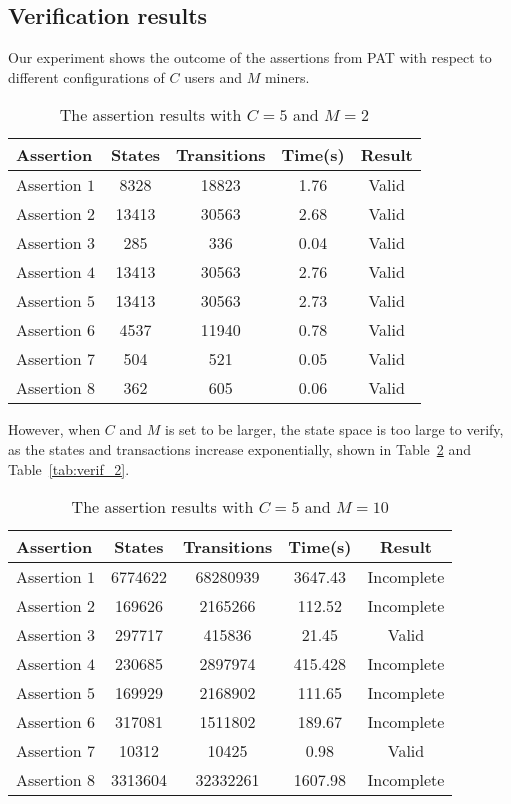 \documentclass{KERauth}
\begin{document}
\subsection{Verification results}
Our experiment shows the outcome of the assertions from PAT with respect to different configurations of $C$ users and $M$ miners.

\begin{table}[h]
    \centering
    \begin{tabular}{l|c|c|c|c}
    \hline
    {\bf Assertion} &{\bf States}& {\bf Transitions} &{\bf Time}(s)& {\bf Result}\\
    \hline
Assertion $1$ &8328 &18823 &1.76 &Valid\\
Assertion $2$ & 13413 &30563& 2.68 &Valid\\
Assertion $3$ &285 &336& 0.04& Valid\\
Assertion $4$ &13413 &30563& 2.76 &Valid\\
Assertion $5$ &13413 &30563 &2.73& Valid\\
Assertion $6$ &4537 &11940 &0.78 &Valid\\
Assertion $7$ &504& 521 &0.05 &Valid\\
Assertion $8$& 362 &605& 0.06 &Valid\\
\hline
    \end{tabular}
    \caption{The assertion results with $C = 5$ and $M = 2$}
    \label{tab:verification}
\end{table}

However, when $C$ and $M$ is set to be larger, the state space is too large to verify, as the states and transactions increase exponentially, shown in Table~\ref{tab:verif_1} and Table~\ref{tab:verif_2}.

\begin{table}[h]
    \centering
    \begin{tabular}{l|c|c|c|c}
    \hline
      Assertion &States &Transitions& Time(s) &Result\\
      \hline
Assertion $1$ & 6774622& 68280939 &3647.43 &Incomplete\\
Assertion $2$ & 169626 & 2165266 & 112.52 & Incomplete\\
Assertion $3$ & 297717 & 415836 & 21.45 & Valid\\
Assertion $4$ & 230685 & 2897974 & 415.428 & Incomplete\\
Assertion $5$ & 169929 & 2168902 & 111.65 & Incomplete\\
Assertion $6$ & 317081 & 1511802 & 189.67 & Incomplete\\
Assertion $7$ & 10312 & 10425 & 0.98 & Valid\\
Assertion $8$ & 3313604 & 32332261 & 1607.98 & Incomplete\\
\hline
    \end{tabular}
    \caption{The assertion results with $C = 5$ and $M = 10$}
    \label{tab:verif_1}
\end{table}
\end{document}
